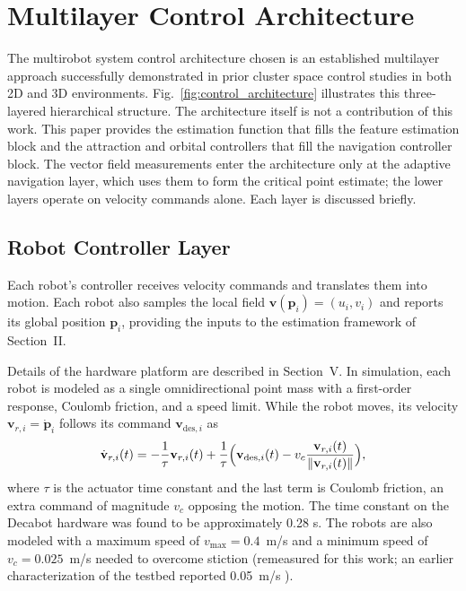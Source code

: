\documentclass[lettersize,journal]{IEEEtran}
\begin{document}
\section{Multilayer Control Architecture}


The multirobot system control architecture chosen is an established multilayer approach successfully demonstrated in prior cluster space control studies in both 2D \cite{5,8,10} and 3D \cite{7,9} environments. Fig.~\ref{fig:control_architecture} illustrates this three-layered hierarchical structure. The architecture itself is not a contribution of this work. This paper provides the estimation function that fills the feature estimation block and the attraction and orbital controllers that fill the navigation controller block. The vector field measurements enter the architecture only at the adaptive navigation layer, which uses them to form the critical point estimate; the lower layers operate on velocity commands alone. Each layer is discussed briefly.



\subsection{Robot Controller Layer}
\noindent 

Each robot's controller receives velocity commands and translates them into motion. Each robot also samples the local field $\mathbf{v}(\mathbf{p}_i) = (u_i, v_i)$ and reports its global position $\mathbf{p}_i$, providing the inputs to the estimation framework of Section~II.

Details of the hardware platform are described in Section~V. In simulation, each robot is modeled as a single omnidirectional point mass with a first-order response, Coulomb friction, and a speed limit. While the robot moves, its velocity $\mathbf{v}_{r,i} = \dot{\mathbf{p}}_i$ follows its command $\mathbf{v}_{\text{des},i}$ as
\begin{equation}
    \dot{\mathbf{v}}_{r,i}(t) = -\frac{1}{\tau}\mathbf{v}_{r,i}(t) + \frac{1}{\tau}\Bigl(\mathbf{v}_{\text{des},i}(t) - v_c\frac{\mathbf{v}_{r,i}(t)}{\|\mathbf{v}_{r,i}(t)\|}\Bigr),
    \label{eq:continuous}
\end{equation}
where $\tau$ is the actuator time constant \cite{4,7} and the last term is Coulomb friction, an extra command of magnitude $v_c$ opposing the motion. The time constant on the Decabot hardware was found to be approximately 0.28 s.  The robots are also modeled with a maximum speed of $v_{\max} = 0.4$~m/s and a minimum speed of $v_c = 0.025$~m/s needed to overcome stiction (remeasured for this work; an earlier characterization of the testbed reported 0.05~m/s \cite{22}).
\end{document}
